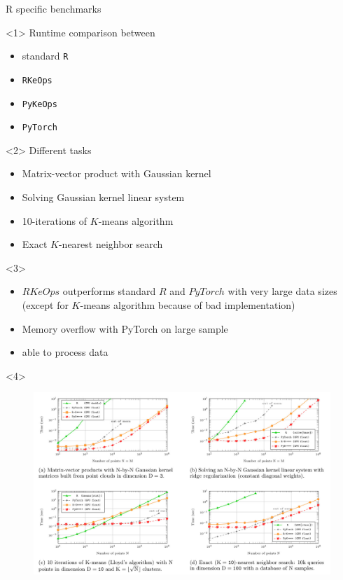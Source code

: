 \documentclass[14pt]{beamer}
\begin{document}
\begin{frame}{R specific benchmarks}

\begin{onlyenv}<1>
Runtime comparison between 
\begin{itemize}
\setitsep{1em}
\item standard \texttt{R}
\item \texttt{RKeOps}
\item \texttt{PyKeOps}
\item \texttt{PyTorch}
\end{itemize}
\end{onlyenv}

\begin{onlyenv}<2>
Different tasks

\begin{itemize}
\small
\setitsep{1em}
\item Matrix-vector product with Gaussian kernel
\item Solving Gaussian kernel linear system
\item 10-iterations of $K$-means algorithm
\item Exact $K$-nearest neighbor search
\end{itemize}
\end{onlyenv}

\begin{onlyenv}<3>
\begin{itemize}
\setitsep{1em}
\item $RKeOps$ outperforms standard $R$ and $PyTorch$ with very large data sizes\\
{\footnotesize (except for $K$-means algorithm because of bad implementation)}
\item Memory overflow with PyTorch on large sample
\item {} able to process data 
\end{itemize}

\end{onlyenv}

\begin{onlyenv}<4>
\begin{figure}
\centering
\includegraphics[width=\linewidth]{./images/benchmark2.jpg}
\end{figure}
\end{onlyenv}
\end{frame}
\end{document}
